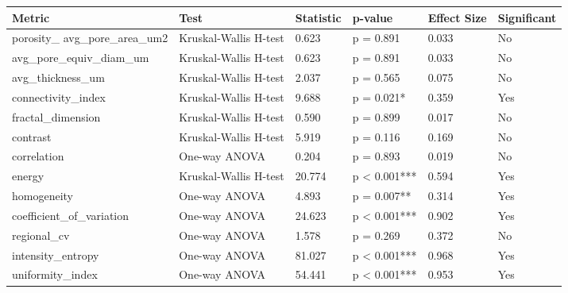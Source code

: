 \begin{tabular}{llllll}
\toprule
Metric & Test & Statistic & p-value & Effect Size & Significant \\
\midrule
porosity_%
avg_pore_area_um2 & Kruskal-Wallis H-test & 0.623 & p = 0.891 & 0.033 & No \\
avg_pore_equiv_diam_um & Kruskal-Wallis H-test & 0.623 & p = 0.891 & 0.033 & No \\
avg_thickness_um & Kruskal-Wallis H-test & 2.037 & p = 0.565 & 0.075 & No \\
connectivity_index & Kruskal-Wallis H-test & 9.688 & p = 0.021* & 0.359 & Yes \\
fractal_dimension & Kruskal-Wallis H-test & 0.590 & p = 0.899 & 0.017 & No \\
contrast & Kruskal-Wallis H-test & 5.919 & p = 0.116 & 0.169 & No \\
correlation & One-way ANOVA & 0.204 & p = 0.893 & 0.019 & No \\
energy & Kruskal-Wallis H-test & 20.774 & p < 0.001*** & 0.594 & Yes \\
homogeneity & One-way ANOVA & 4.893 & p = 0.007** & 0.314 & Yes \\
coefficient_of_variation & One-way ANOVA & 24.623 & p < 0.001*** & 0.902 & Yes \\
regional_cv & One-way ANOVA & 1.578 & p = 0.269 & 0.372 & No \\
intensity_entropy & One-way ANOVA & 81.027 & p < 0.001*** & 0.968 & Yes \\
uniformity_index & One-way ANOVA & 54.441 & p < 0.001*** & 0.953 & Yes \\
\bottomrule
\end{tabular}
